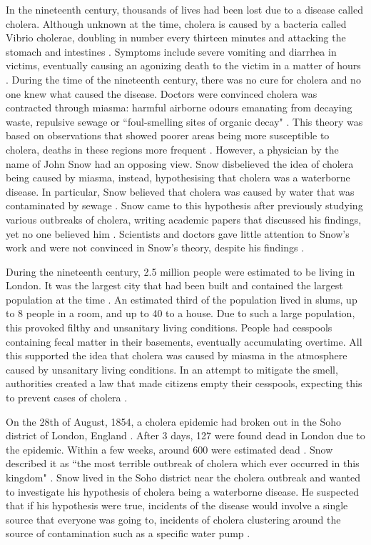 \documentclass[12pt]{article}
\begin{document}
In the nineteenth century, thousands of lives had been lost due to a disease called cholera. Although unknown at the time, cholera is caused by a bacteria called Vibrio cholerae, doubling in number every thirteen minutes and attacking the stomach and intestines \cite{channel1}. Symptoms include severe vomiting and diarrhea in victims, eventually causing an agonizing death to the victim in a matter of hours \cite{heros, channel1}. During the time of the nineteenth century, there was no cure for cholera and no one knew what caused the disease. Doctors were convinced cholera was contracted through miasma: harmful airborne odours emanating from decaying waste, repulsive sewage or ``foul-smelling sites of organic decay" \cite{ucla, test}. This theory was based on observations that showed poorer areas being more susceptible to cholera, deaths in these regions more frequent \cite{heros}. However, a physician by the name of John Snow had an opposing view. Snow disbelieved the idea of cholera being caused by miasma, instead, hypothesising that cholera was a waterborne disease. In particular, Snow believed that cholera was caused by water that was contaminated by sewage \cite{ucla}. Snow came to this hypothesis after previously studying various outbreaks of cholera, writing academic papers that discussed his findings, yet no one believed him \cite{original}. Scientists and doctors gave little attention to Snow's work and were not convinced in Snow's theory, despite his findings \cite{ucla}. 

During the nineteenth century, 2.5 million people were estimated to be living in London. It was the largest city that had been built and contained the largest population at the time \cite{channel1, tedtalk}. An estimated third of the population lived in slums, up to 8 people in a room, and up to 40 to a house. Due to such a large population, this provoked filthy and unsanitary living conditions. People had cesspools containing fecal matter in their basements, eventually accumulating overtime. All this supported the idea that cholera was caused by miasma in the atmosphere caused by unsanitary living conditions. In an attempt to mitigate the smell, authorities created a law that made citizens empty their cesspools, expecting this to prevent cases of cholera \cite{tedtalk, johnson}. 

On the 28th of August, 1854, a cholera epidemic had broken out in the Soho district of London, England \cite{tedtalk}. After 3 days, 127 were found dead in London due to the epidemic. Within a few weeks, around 600 were estimated dead \cite{youtube, tedtalk}. Snow described it as ``the most terrible outbreak of cholera which ever occurred in this kingdom" \cite{ucla}. Snow lived in the Soho district near the cholera outbreak and wanted to investigate his hypothesis of cholera being a waterborne disease. He suspected that if his hypothesis were true, incidents of the disease would involve a single source that everyone was going to, incidents of cholera clustering around the source of contamination such as a specific water pump \cite{test, tedtalk, johnson}. 
\end{document}

